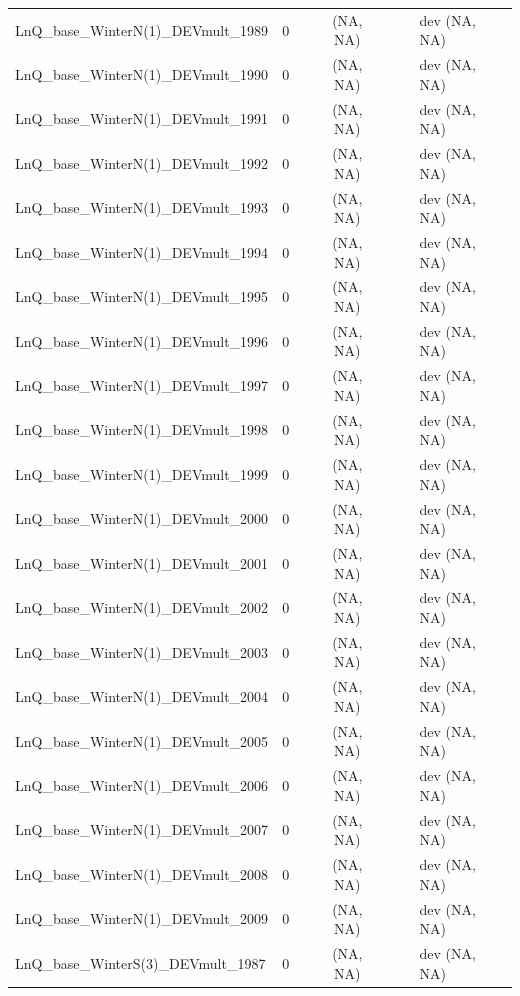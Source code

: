 \documentclass[12pt,]{article}
\begin{document}
\begin{landscape}
\begin{longtable}{lrcccll}
  LnQ\_base\_WinterN(1)\_DEVmult\_1989 & 0 &  & (NA, NA) &  &  & dev (NA, NA) \\ 
  LnQ\_base\_WinterN(1)\_DEVmult\_1990 & 0 &  & (NA, NA) &  &  & dev (NA, NA) \\ 
  LnQ\_base\_WinterN(1)\_DEVmult\_1991 & 0 &  & (NA, NA) &  &  & dev (NA, NA) \\ 
  LnQ\_base\_WinterN(1)\_DEVmult\_1992 & 0 &  & (NA, NA) &  &  & dev (NA, NA) \\ 
  LnQ\_base\_WinterN(1)\_DEVmult\_1993 & 0 &  & (NA, NA) &  &  & dev (NA, NA) \\ 
  LnQ\_base\_WinterN(1)\_DEVmult\_1994 & 0 &  & (NA, NA) &  &  & dev (NA, NA) \\ 
  LnQ\_base\_WinterN(1)\_DEVmult\_1995 & 0 &  & (NA, NA) &  &  & dev (NA, NA) \\ 
  LnQ\_base\_WinterN(1)\_DEVmult\_1996 & 0 &  & (NA, NA) &  &  & dev (NA, NA) \\ 
  LnQ\_base\_WinterN(1)\_DEVmult\_1997 & 0 &  & (NA, NA) &  &  & dev (NA, NA) \\ 
  LnQ\_base\_WinterN(1)\_DEVmult\_1998 & 0 &  & (NA, NA) &  &  & dev (NA, NA) \\ 
  LnQ\_base\_WinterN(1)\_DEVmult\_1999 & 0 &  & (NA, NA) &  &  & dev (NA, NA) \\ 
  LnQ\_base\_WinterN(1)\_DEVmult\_2000 & 0 &  & (NA, NA) &  &  & dev (NA, NA) \\ 
  LnQ\_base\_WinterN(1)\_DEVmult\_2001 & 0 &  & (NA, NA) &  &  & dev (NA, NA) \\ 
  LnQ\_base\_WinterN(1)\_DEVmult\_2002 & 0 &  & (NA, NA) &  &  & dev (NA, NA) \\ 
  LnQ\_base\_WinterN(1)\_DEVmult\_2003 & 0 &  & (NA, NA) &  &  & dev (NA, NA) \\ 
  LnQ\_base\_WinterN(1)\_DEVmult\_2004 & 0 &  & (NA, NA) &  &  & dev (NA, NA) \\ 
  LnQ\_base\_WinterN(1)\_DEVmult\_2005 & 0 &  & (NA, NA) &  &  & dev (NA, NA) \\ 
  LnQ\_base\_WinterN(1)\_DEVmult\_2006 & 0 &  & (NA, NA) &  &  & dev (NA, NA) \\ 
  LnQ\_base\_WinterN(1)\_DEVmult\_2007 & 0 &  & (NA, NA) &  &  & dev (NA, NA) \\ 
  LnQ\_base\_WinterN(1)\_DEVmult\_2008 & 0 &  & (NA, NA) &  &  & dev (NA, NA) \\ 
  LnQ\_base\_WinterN(1)\_DEVmult\_2009 & 0 &  & (NA, NA) &  &  & dev (NA, NA) \\ 
  LnQ\_base\_WinterS(3)\_DEVmult\_1987 & 0 &  & (NA, NA) &  &  & dev (NA, NA) \\ 

\end{longtable}
\end{landscape}
\end{document}
